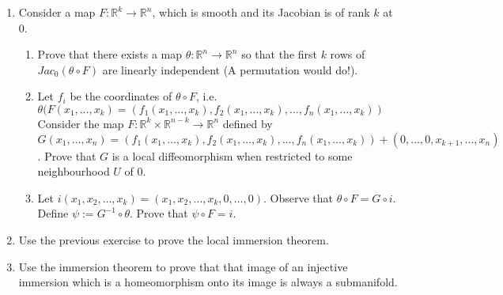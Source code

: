 \begin{enumerate}
\item Consider a map $F : \mathbb{R}^k \to \mathbb{R}^n$, which is smooth and its Jacobian is of rank $k$ at $0$. 
  \begin{enumerate}
\item Prove that there exists a map $\theta : \mathbb{R}^n \to \mathbb{R}^n$ so that the first $k$ rows of $Jac_0(\theta \circ F)$ are linearly independent (A permutation would do!).
\item Let $f_i$ be the coordinates of $\theta \circ F$, i.e.\\ $\theta(F(x_1, \ldots, x_k) = (f_1(x_1, \ldots, x_k), f_2(x_1, \ldots, x_k), \ldots, f_n(x_1, \ldots, x_k))$
  Consider the map $F : \mathbb{R}^k \times \mathbb{R}^{n-k} \to \mathbb{R}^n$ defined by $G(x_1, \ldots, x_n) = (f_1(x_1, \ldots, x_k), f_2(x_1, \ldots, x_k), \ldots, f_n(x_1, \ldots, x_k))+(0, \ldots, 0, x_{k+1}, \ldots, x_n)$. Prove that $G$ is a local diffeomorphism when restricted to some neighbourhood $U$ of 0.
    \item Let $i(x_1, x_2, \ldots, x_k) = (x_1, x_2, \ldots, x_k, 0, \ldots, 0)$. Observe that $\theta \circ F = G \circ i$. Define $\psi := G^{-1} \circ \theta$. Prove that $\psi \circ F= i$.
  \end{enumerate}

\item Use the previous exercise to prove the local immersion theorem.

  \item Use the immersion theorem to prove that that image of an injective immersion which is a homeomorphism onto its image is always a submanifold.
 
\end{enumerate}
